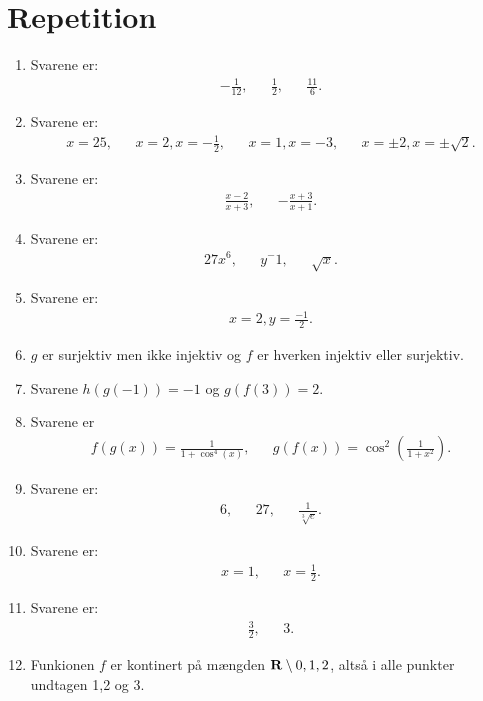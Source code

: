 \section{Repetition}
\begin{enumerate}
	\item Svarene er:
	\begin{align*}
	-\frac{1}{12},&& \frac{1}{2},&& \frac{11}{6}.
	\end{align*}
	\item Svarene er:
	\begin{align*}
	x=25,&& x=2,x=-\frac{1}{2},&& x=1,x=-3,&& x=\pm 2,x=\pm \sqrt{2}.
	\end{align*}
	\item Svarene er:
	\begin{align*}
	\frac{x-2}{x+3},&& -\frac{x+3}{x+1}.
	\end{align*}
	\item Svarene er:
	\begin{align*}
	27x^6,&& y^-1,&& \sqrt{x}.
	\end{align*}
	\item Svarene er: 
\begin{align*}
x=2,y=\frac{-1}{2}.
\end{align*}
	\item $g$ er surjektiv men ikke injektiv og $f$ er hverken injektiv eller surjektiv.
	
	\item Svarene  $h(g(-1))=-1$ og $ g(f(3))=2 $.
	
	\item Svarene er
	\begin{align*}
	f(g(x))=\frac{1}{1+\cos^4(x)},&& g(f(x))=\cos^2(\frac{1}{1+x^2}).
	\end{align*}
	
	\item Svarene er:
	\begin{align*}
	6,&& 27,&& \frac{1}{\sqrt[3]{e}}.
	\end{align*}
	
	\item Svarene er:
	\begin{align*}
	x=1, && x=\frac{1}{2}.
	\end{align*}
	
	\item Svarene er:
	\begin{align*}
	\frac{3}{2},&& 3.
	\end{align*}
	
	\item Funkionen $f$ er kontinert på mængden $\mathbf{R}\setminus{0,1,2}$, altså i alle punkter undtagen 1,2 og 3.
	

\end{enumerate}

